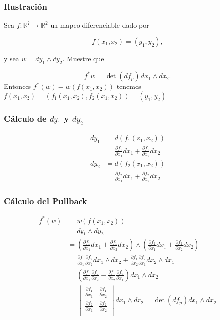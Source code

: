 \documentclass{beamer}
\begin{document}
\begin{frame}
\frametitle{Ilustración}

Sea \( f:\mathbb{R}^{2} \to \mathbb{R}^{2} \) un mapeo diferenciable dado por 

\[ f(x_{1},x_{2}) = (y_{1},y_{2}), \]

y sea \( w = dy_{1} \wedge dy_{2}. \) Muestre que 

\[ f^{*}w = \det(df_{p}) \, dx_{1} \wedge dx_{2}. \] Entonces \( f^{*}(w)=w(f(x_{1},x_{2})) \) tenemos \( f(x_{1},x_{2})=(f_{1}(x_{1},x_{2}), f_{2}(x_{1},x_{2}))=(y_{1}, y_{2}) \)

\end{frame}

\begin{frame}
\frametitle{Cálculo de \( dy_{1} \) y \( dy_{2} \)}

\begin{align*}
dy_{1} &= d(f_{1}(x_{1},x_{2})) \\
&= \frac{\partial f_{1}}{\partial x_{1}} dx_{1} + \frac{\partial f_{1}}{ \partial x_{2}} dx_{2}
\end{align*}
\begin{align*}
dy_{2} &= d(f_{2}(x_{1},x_{2})) \\
&= \frac{\partial f_{2}}{\partial x_{1}} dx_{1} + \frac{\partial f_{2}}{ \partial x_{2}} dx_{2}
\end{align*}

\end{frame}

\begin{frame}
\frametitle{Cálculo del Pullback}

\begin{align*}
    f^{*}(w) &= w(f(x_{1},x_{2})) \\
    &= dy_{1} \wedge dy_{2} \\
    &= \left(\frac{\partial f_{1}}{\partial x_{1}} dx_{1} + \frac{\partial f_{1}}{ \partial x_{2}} dx_{2}\right) \wedge \left(\frac{\partial f_{2}}{\partial x_{1}} dx_{1} + \frac{\partial f_{2}}{ \partial x_{2}} dx_{2}\right)  \\
    &= \frac{\partial f_{1}}{\partial x_{1}} \frac{\partial f_{2}}{\partial x_{2}} dx_{1} \wedge dx_{2} + \frac{\partial f_{1}}{\partial x_{2}} \frac{\partial f_{2}}{\partial x_{1}} dx_{2} \wedge dx_{1} \\
    &= \left(\frac{\partial f_{1}}{\partial x_{1}} \frac{\partial f_{2}}{\partial x_{2}} - \frac{\partial f_{1}}{\partial x_{2}} \frac{\partial f_{2}}{\partial x_{1}} \right) dx_{1} \wedge dx_{2} \\
    &= \begin{vmatrix}
    \frac{\partial f_{1}}{\partial x_{1}} & \frac{\partial f_{1}}{\partial x_{2}} \\
    \frac{\partial f_{2}}{\partial x_{1}} & \frac{\partial f_{2}}{\partial x_{2}} \\
    \end{vmatrix} dx_{1} \wedge dx_{2} = \det(df_{p}) dx_{1} \wedge dx_{2}
\end{align*}

\end{frame}
\end{document}
